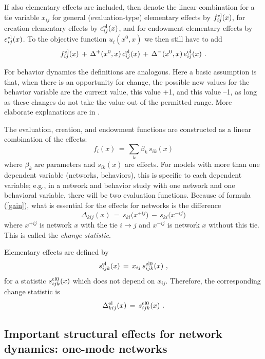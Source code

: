 \documentclass[a4paper,fleqn,11pt]{article}
\newcommand{\+}{\, + \,}
\begin{document}
If also elementary effects are included, then denote the linear combination
for a tie variable $x_{ij}$
for general (evaluation-type) elementary effects by  $f^{\rm{el}}_{ij}(x)$, for creation
elementary effects by  $c^{\rm{el}}_{ij}(x)$, and for endowment elementary effects
by  $e^{\rm{el}}_{ij}(x)$.
To the objective function $ u_i(x^0, x)$ we then still have to add
\[
     f^{\rm{el}}_{ij}(x) \,+\,   \Delta^+(x^0, x)\, c^{\rm{el}}_{ij}(x)
                   \,+\,  \Delta^-(x^0, x)\,e^{\rm{el}}_{ij}(x) \ .
\]

For behavior dynamics the definitions are analogous.
Here a basic assumption is that, when there is an opportunity for change,
the possible new values for the behavior variable are the current
value, this value +1, and this value --1, as long as these changes
do not take the value out of the permitted range.
More elaborate explanations are in
\citep*{SnijdersEA07, SnijdersEA10b, SteglichEA10, VeenstraEtAl2013}.

The evaluation, creation, and endowment functions are constructed as a
linear combination of the effects:
\begin{equation}  \label{obj.fu}
f_i(x) \, = \, \sum_k \beta_k \, s_{ik}(x)
\end{equation}
where $\beta_k$ are parameters and $s_{ik}(x)$ are effects.
For models with more than one dependent variable (networks, behaviors),
this is specific to each dependent variable; e.g., in a network and behavior
study with one network and one behavioral variable, there will be two evaluation
functions.
Because of formula (\ref{gain}), what is essential for the effects for networks
is the difference
\begin{equation}
   \Delta_{kij} (x) \,=\,  s_{ki}\big(x^{+ij}\big) \, - \,  s_{ki}\big(x^{-ij}\big)  \label{changestat0}
\end{equation}
where $x^{+ij}$ is network $x$ with the tie $i \rightarrow j$
and $x^{-ij}$ is network $x$ without this tie.
This is called the \emph{change statistic}.

Elementary effects are defined by
\[
    s^{\rm el}_{ijk}(x) \, = \, x_{ij}\,s^{\rm el0}_{ijk}(x) \ ,
\]
for a statistic $s^{\rm el0}_{ijk}(x)$ which does not depend on $x_{ij}$. Therefore,
the corresponding change statistic is
\[
    \Delta^{\rm el}_{kij} (x) \,=\, s^{\rm el0}_{ijk}(x) \ .
\]




\subsection{Important structural effects for network dynamics:
           \protect\newline one-mode networks}
\label{S_imp_str1}
\end{document}
